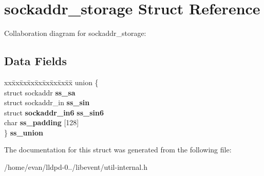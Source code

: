 \section{sockaddr\-\_\-storage \-Struct \-Reference}
\label{structsockaddr__storage}


\-Collaboration diagram for sockaddr\-\_\-storage\-:
\subsection*{\-Data \-Fields}
\begin{DoxyCompactItemize}
\item 
\begin{tabbing}
xx\=xx\=xx\=xx\=xx\=xx\=xx\=xx\=xx\=\kill
union \{\\
\>struct sockaddr {\bfseries ss\_sa}\\
\>struct sockaddr\_in {\bfseries ss\_sin}\\
\>struct {\bf sockaddr\_in6} {\bfseries ss\_sin6}\\
\>char {\bfseries ss\_padding} [128]\\
\} {\bfseries ss\_union}\label{structsockaddr__storage_adcc1cb4f92729ed3420b53ff7f33423f}
\\

\end{tabbing}\end{DoxyCompactItemize}


\-The documentation for this struct was generated from the following file\-:\begin{DoxyCompactItemize}
\item 
/home/evan/lldpd-\/0../libevent/util-\/internal.\-h\end{DoxyCompactItemize}
